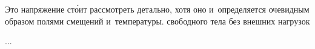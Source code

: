 \begin{otherlanguage}{russian}

Это напряжение ст\'{о}ит рассмотреть детально, хотя оно и~определяется очевидным образом полями смещений и~температуры.
свободного тела без внешних нагрузок

...



\end{otherlanguage}



\label{section:variationalformulations.thermoelasticity}

